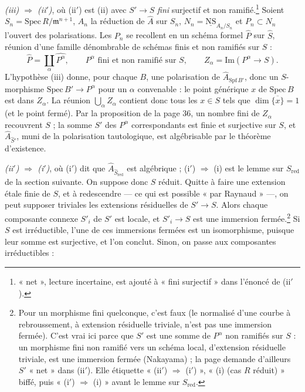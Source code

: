 \documentclass[11pt,a4paper]{article}
\begin{document}
\emph{(iii) $\Rightarrow$ (ii$'$)}, où (ii$'$) est (ii) avec $S' \to S$
\emph{fini} surjectif et non ramifié.\footnote{« net », lecture incertaine,
est ajouté à « fini surjectif » dans l'énoncé de (ii$'$).} Soient $S_n = \mathrm{Spec}\,R/\mathfrak{m}^{n+1}$,
$A_n$ la réduction de $\hat A$ sur $S_n$, $N_n =
\underline{\mathrm{NS}}_{A_n/S_n}$ et $P_n \subset N_n$ l'ouvert des
polarisations. Les $P_n$ se recollent en un schéma formel $\hat P$ sur $\hat S$,
réunion d'une famille dénombrable de schémas finis et non ramifiés sur $S$ :
\[
  \hat P = \coprod_\alpha \widehat{P^\alpha}, \qquad P^\alpha \text{ fini et
  non ramifié sur } S, \qquad Z_\alpha = \mathrm{Im}(P^\alpha \to S).
\]
L'hypothèse (iii) donne, pour chaque $B$, une polarisation de
$\hat A_{\mathrm{Spf}\,B'}$, donc un $S$-morphisme $\mathrm{Spec}\,B' \to
P^\alpha$ pour un $\alpha$ convenable : le point générique $x$ de
$\mathrm{Spec}\,B$ est dans $Z_\alpha$. La réunion $\bigcup_\alpha Z_\alpha$
contient donc tous les $x \in S$ tels que $\dim \overline{\{x\}} = 1$ (et le
point fermé). Par la proposition de la page 36, un nombre fini de
$Z_\alpha$ recouvrent $S$ ; la somme $S'$ des $P^\alpha$ correspondants est
finie et surjective sur $S$, et $\hat A_{\hat S'}$, muni de la polarisation
tautologique, est algébrisable par le théorème d'existence.

\emph{(ii$'$) $\Rightarrow$ (i$'$)}, où (i$'$) dit que $\hat A_{\hat
S_{\mathrm{red}}}$ est algébrique ; (i$'$) $\Rightarrow$ (i) est le lemme sur
$S_{\mathrm{red}}$ de la section suivante. On suppose donc $S$ réduit.
Quitte à faire une extension étale finie de $S$, et à redescendre --- ce qui
est possible « par Raynaud » ---, on peut supposer triviales les extensions
résiduelles de $S' \to S$. Alors chaque composante connexe $S'_i$ de $S'$ est
locale, et $S'_i \to S$ est une immersion fermée.\footnote{Pour un morphisme
fini quelconque, c'est faux (le normalisé d'une courbe à rebroussement, à
extension résiduelle triviale, n'est pas une immersion fermée). C'est vrai
ici parce que $S'$ est une somme de $P^\alpha$ non ramifiés sur $S$ : un
morphisme fini non ramifié vers un schéma local, d'extension résiduelle
triviale, est une immersion fermée (Nakayama) ; la page demande d'ailleurs
$S'$ « net » dans (ii$'$). Elle étiquette « (ii$'$) $\Rightarrow$ (i$'$) »,
« (i) (cas $R$ réduit) » biffé, puis « (i$'$) $\Rightarrow$ (i) » avant le
lemme sur $S_{\mathrm{red}}$.} Si $S$ est
irréductible, l'une de ces immersions fermées est un isomorphisme, puisque
leur somme est surjective, et l'on conclut. Sinon, on passe aux composantes
irréductibles :
\end{document}
